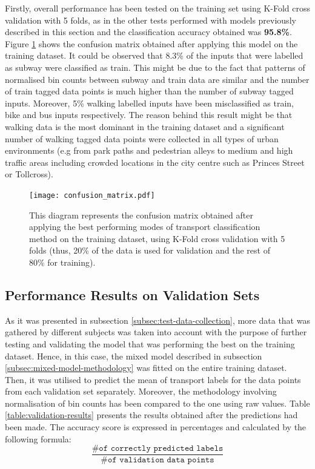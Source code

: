 \documentclass[bsc,frontabs,twoside,singlespacing, parskip,deptreport]{infthesis}     %
\begin{document}
Firstly, overall performance has been tested on the training set using K-Fold cross validation with 5 folds, as in the other tests performed with models previously described in this section and the classification accuracy obtained was \textbf{95.8\%}. Figure \ref{fig:confusion_matrix} shows the confusion matrix obtained after applying this model on the training dataset. It could be observed that 8.3\% of the inputs that were labelled as subway were classified as train. This might be due to the fact that patterns of normalised bin counts between subway and train data are similar and the number of train tagged data points is much higher than the number of subway tagged inputs. Moreover, 5\% walking labelled inputs have been misclassified as train, bike and bus inputs respectively. The reason behind this result might be that walking data is the most dominant in the training dataset and a significant number of walking tagged data points were collected in all types of urban environments (e.g from park paths and pedestrian alleys to medium and high traffic areas including crowded locations in the city centre such as Princes Street or Tollcross).

\begin{figure}[h!]
  \center
  \texttt{[image: confusion\_matrix.pdf]}
  \caption{This diagram represents the confusion matrix obtained after applying the best performing modes of transport classification method on the training dataset, using K-Fold cross validation with 5 folds (thus, 20\% of the data is used for validation and the rest of 80\% for training).}
  \label{fig:confusion_matrix}
\end{figure}


\subsection{Performance Results on Validation Sets}

As it was presented in subsection \ref{subsec:test-data-collection}, more data that was gathered by different subjects was taken into account with the purpose of further testing and validating the model that was performing the best on the training dataset. Hence, in this case, the mixed model described in subsection \ref{subsec:mixed-model-methodology} was fitted on the entire training dataset. Then, it was utilised to predict the mean of transport labels for the data points from each validation set separately. Moreover, the methodology involving normalisation of bin counts has been compared to the one using raw values. Table \ref{table:validation-results} presents the results obtained after the predictions had been made. The accuracy score is expressed in percentages and calculated by the following formula: $$ \frac{\texttt{\# of correctly predicted labels}}{\texttt{\# of validation data points}} $$
\end{document}
